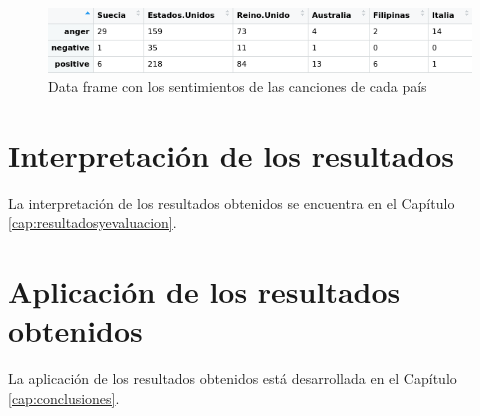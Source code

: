\begin{figure}[h]
	\centering
	\includegraphics[width=0.7\linewidth]{Imagenes/sentimenttablebycountry}
	\caption{Data frame con los sentimientos de las canciones de cada país}
	\label{fig:sentimenttablebycountry}
\end{figure}

\section{Interpretación de los resultados}

La interpretación de los resultados obtenidos se encuentra en el Capítulo \ref{cap:resultadosyevaluacion}.

\section{Aplicación de los resultados obtenidos}

La aplicación de los resultados obtenidos está desarrollada en el Capítulo \ref{cap:conclusiones}.
